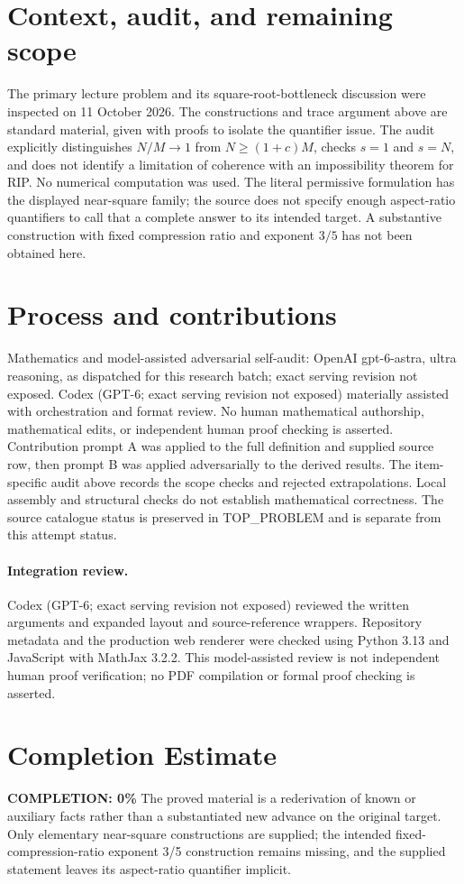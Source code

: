 \documentclass[11pt]{article}
\begin{document}
\section{Context, audit, and remaining scope}
The primary lecture problem and its square-root-bottleneck discussion were
inspected on 11 October 2026. The constructions and trace argument above are
standard material, given with proofs to isolate the quantifier issue.
The audit explicitly distinguishes $N/M\to1$ from $N\ge(1+c)M$, checks
$s=1$ and $s=N$, and does not identify a limitation of coherence with an
impossibility theorem for RIP. No numerical computation was used.
The literal permissive formulation has the displayed near-square family;
the source does not specify enough aspect-ratio quantifiers to call that a
complete answer to its intended target. A substantive construction with fixed
compression ratio and exponent $3/5$ has not been obtained here.

\section{Process and contributions}
Mathematics and model-assisted adversarial self-audit: OpenAI gpt-6-astra, ultra reasoning, as dispatched for this research batch; exact serving revision not exposed. Codex (GPT-6; exact serving revision not exposed) materially assisted with orchestration and format review. No human mathematical authorship, mathematical edits, or independent human proof checking is asserted.
Contribution prompt A was applied to the full definition and supplied source row, then prompt B was applied adversarially to the derived results. The item-specific audit above records the scope checks and rejected extrapolations. Local assembly and structural checks do not establish mathematical correctness. The source catalogue status is preserved in TOP\_PROBLEM and is separate from this attempt status.
\paragraph{Integration review.} Codex (GPT-6; exact serving revision not exposed) reviewed the written arguments and expanded layout and source-reference wrappers. Repository metadata and the production web renderer were checked using Python 3.13 and JavaScript with MathJax 3.2.2. This model-assisted review is not independent human proof verification; no PDF compilation or formal proof checking is asserted.

\section{Completion Estimate}
\noindent\textbf{COMPLETION: 0\%}
The proved material is a rederivation of known or auxiliary facts rather than a substantiated new advance on the original target. Only elementary near-square constructions are supplied; the intended fixed-compression-ratio exponent 3/5 construction remains missing, and the supplied statement leaves its aspect-ratio quantifier implicit.
\end{document}
